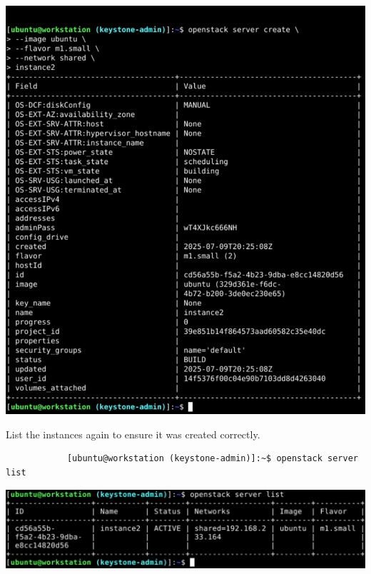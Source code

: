 \documentclass[letterpaper, 12pt]{article}
\begin{document}
\begin{enumerate}
\begin{labstep}
        \begin{center}
            \includegraphics[width=\linewidth]{images/part2/step3.png}
        \end{center}
    \end{labstep}

    \begin{labstep}
        List the instances again to ensure it was created correctly.
        \begin{lstlisting}
            [ubuntu@workstation (keystone-admin)]:~$ openstack server list
        \end{lstlisting}

        \begin{center}
            \includegraphics[width=\linewidth]{images/part2/step4.png}
        \end{center}
    \end{labstep}


\end{enumerate}
\end{document}
